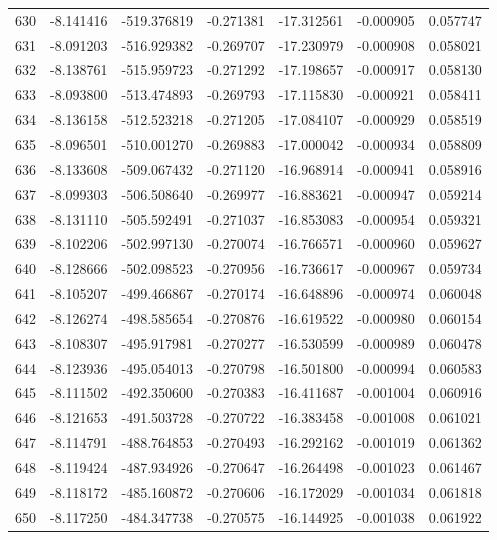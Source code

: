 \begin{tabular}{rrrrrrr}
 630 &  -8.141416 & -519.376819 & -0.271381 & -17.312561 &  -0.000905 &  0.057747 \\
 631 &  -8.091203 & -516.929382 & -0.269707 & -17.230979 &  -0.000908 &  0.058021 \\
 632 &  -8.138761 & -515.959723 & -0.271292 & -17.198657 &  -0.000917 &  0.058130 \\
 633 &  -8.093800 & -513.474893 & -0.269793 & -17.115830 &  -0.000921 &  0.058411 \\
 634 &  -8.136158 & -512.523218 & -0.271205 & -17.084107 &  -0.000929 &  0.058519 \\
 635 &  -8.096501 & -510.001270 & -0.269883 & -17.000042 &  -0.000934 &  0.058809 \\
 636 &  -8.133608 & -509.067432 & -0.271120 & -16.968914 &  -0.000941 &  0.058916 \\
 637 &  -8.099303 & -506.508640 & -0.269977 & -16.883621 &  -0.000947 &  0.059214 \\
 638 &  -8.131110 & -505.592491 & -0.271037 & -16.853083 &  -0.000954 &  0.059321 \\
 639 &  -8.102206 & -502.997130 & -0.270074 & -16.766571 &  -0.000960 &  0.059627 \\
 640 &  -8.128666 & -502.098523 & -0.270956 & -16.736617 &  -0.000967 &  0.059734 \\
 641 &  -8.105207 & -499.466867 & -0.270174 & -16.648896 &  -0.000974 &  0.060048 \\
 642 &  -8.126274 & -498.585654 & -0.270876 & -16.619522 &  -0.000980 &  0.060154 \\
 643 &  -8.108307 & -495.917981 & -0.270277 & -16.530599 &  -0.000989 &  0.060478 \\
 644 &  -8.123936 & -495.054013 & -0.270798 & -16.501800 &  -0.000994 &  0.060583 \\
 645 &  -8.111502 & -492.350600 & -0.270383 & -16.411687 &  -0.001004 &  0.060916 \\
 646 &  -8.121653 & -491.503728 & -0.270722 & -16.383458 &  -0.001008 &  0.061021 \\
 647 &  -8.114791 & -488.764853 & -0.270493 & -16.292162 &  -0.001019 &  0.061362 \\
 648 &  -8.119424 & -487.934926 & -0.270647 & -16.264498 &  -0.001023 &  0.061467 \\
 649 &  -8.118172 & -485.160872 & -0.270606 & -16.172029 &  -0.001034 &  0.061818 \\
 650 &  -8.117250 & -484.347738 & -0.270575 & -16.144925 &  -0.001038 &  0.061922 \\

\end{tabular}
